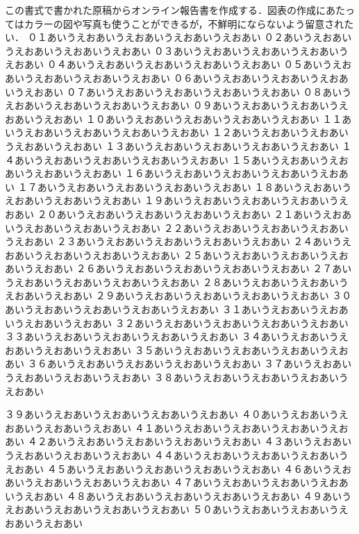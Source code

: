 \documentclass{ltjarticle}
\begin{document}
\msnormalsize
この書式で書かれた原稿からオンライン報告書を作成する．図表の作成にあたってはカラーの図や写真も使うことができるが，不鮮明にならないよう留意されたい．
\newpage
\msnormalsize
\noindent%
０１あいうえおあいうえおあいうえおあいうえおあい
０２あいうえおあいうえおあいうえおあいうえおあい
０３あいうえおあいうえおあいうえおあいうえおあい
０４あいうえおあいうえおあいうえおあいうえおあい
０５あいうえおあいうえおあいうえおあいうえおあい
０６あいうえおあいうえおあいうえおあいうえおあい
０７あいうえおあいうえおあいうえおあいうえおあい
０８あいうえおあいうえおあいうえおあいうえおあい
０９あいうえおあいうえおあいうえおあいうえおあい
１０あいうえおあいうえおあいうえおあいうえおあい
１１あいうえおあいうえおあいうえおあいうえおあい
１２あいうえおあいうえおあいうえおあいうえおあい
１３あいうえおあいうえおあいうえおあいうえおあい
１４あいうえおあいうえおあいうえおあいうえおあい
１５あいうえおあいうえおあいうえおあいうえおあい
１６あいうえおあいうえおあいうえおあいうえおあい
１７あいうえおあいうえおあいうえおあいうえおあい
１８あいうえおあいうえおあいうえおあいうえおあい
１９あいうえおあいうえおあいうえおあいうえおあい
２０あいうえおあいうえおあいうえおあいうえおあい
２１あいうえおあいうえおあいうえおあいうえおあい
２２あいうえおあいうえおあいうえおあいうえおあい
２３あいうえおあいうえおあいうえおあいうえおあい
２４あいうえおあいうえおあいうえおあいうえおあい
２５あいうえおあいうえおあいうえおあいうえおあい
２６あいうえおあいうえおあいうえおあいうえおあい
２７あいうえおあいうえおあいうえおあいうえおあい
２８あいうえおあいうえおあいうえおあいうえおあい
２９あいうえおあいうえおあいうえおあいうえおあい
３０あいうえおあいうえおあいうえおあいうえおあい
３１あいうえおあいうえおあいうえおあいうえおあい
３２あいうえおあいうえおあいうえおあいうえおあい
３３あいうえおあいうえおあいうえおあいうえおあい
３４あいうえおあいうえおあいうえおあいうえおあい
３５あいうえおあいうえおあいうえおあいうえおあい
３６あいうえおあいうえおあいうえおあいうえおあい
３７あいうえおあいうえおあいうえおあいうえおあい
３８あいうえおあいうえおあいうえおあいうえおあい


３９あいうえおあいうえおあいうえおあいうえおあい
４０あいうえおあいうえおあいうえおあいうえおあい
４１あいうえおあいうえおあいうえおあいうえおあい
４２あいうえおあいうえおあいうえおあいうえおあい
４３あいうえおあいうえおあいうえおあいうえおあい
４４あいうえおあいうえおあいうえおあいうえおあい
４５あいうえおあいうえおあいうえおあいうえおあい
４６あいうえおあいうえおあいうえおあいうえおあい
４７あいうえおあいうえおあいうえおあいうえおあい
４８あいうえおあいうえおあいうえおあいうえおあい
４９あいうえおあいうえおあいうえおあいうえおあい
５０あいうえおあいうえおあいうえおあいうえおあい
\end{document}
